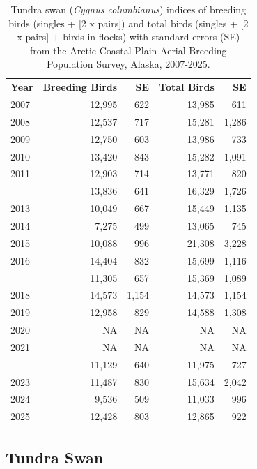 \documentclass[
]{article}
\begin{document}
\begin{longtable}[t]{lrrrr}

\caption{\label{tbl-SWAN}Tundra swan (\emph{Cygnus columbianus}) indices
of breeding birds (singles + {[}2 x pairs{]}) and total birds (singles +
{[}2 x pairs{]} + birds in flocks) with standard errors (SE) from the
Arctic Coastal Plain Aerial Breeding Population Survey, Alaska,
2007-2025.}

\tabularnewline

\\
\toprule
\textbf{Year} & \textbf{Breeding Birds} & \textbf{SE} & \textbf{Total Birds} & \textbf{SE}\\
\midrule
2007 & 12,995 & 622 & 13,985 & 611\\
2008 & 12,537 & 717 & 15,281 & 1,286\\
2009 & 12,750 & 603 & 13,986 & 733\\
2010 & 13,420 & 843 & 15,282 & 1,091\\
2011 & 12,903 & 714 & 13,771 & 820\\
\addlinespace
2012 & 13,836 & 641 & 16,329 & 1,726\\
2013 & 10,049 & 667 & 15,449 & 1,135\\
2014 & 7,275 & 499 & 13,065 & 745\\
2015 & 10,088 & 996 & 21,308 & 3,228\\
2016 & 14,404 & 832 & 15,699 & 1,116\\
\addlinespace
2017 & 11,305 & 657 & 15,369 & 1,089\\
2018 & 14,573 & 1,154 & 14,573 & 1,154\\
2019 & 12,958 & 829 & 14,588 & 1,308\\
2020 & NA & NA & NA & NA\\
2021 & NA & NA & NA & NA\\
\addlinespace
2022 & 11,129 & 640 & 11,975 & 727\\
2023 & 11,487 & 830 & 15,634 & 2,042\\
2024 & 9,536 & 509 & 11,033 & 996\\
2025 & 12,428 & 803 & 12,865 & 922\\
\bottomrule

\end{longtable}

\endgroup{}

\newpage{}

\subsection*{Tundra Swan}\label{tundra-swan-2}
\end{document}
